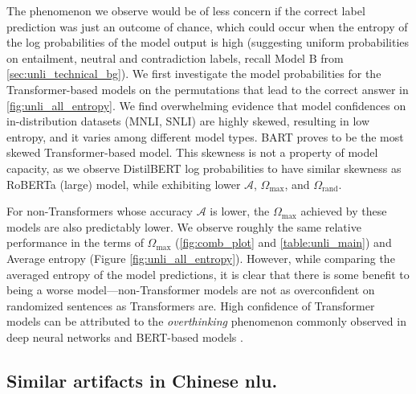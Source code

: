 \documentclass[letterpaper, 12pt]{report}
\begin{document}
The phenomenon we observe would be of less concern if the correct label prediction was just an outcome of chance, which could occur when the entropy of the log probabilities of the model output is high (suggesting uniform probabilities on entailment, neutral and contradiction labels, recall Model B from \autoref{sec:unli_technical_bg}). We first investigate the model probabilities for the Transformer-based models on the permutations that lead to the correct answer in \autoref{fig:unli_all_entropy}. We find overwhelming evidence that model confidences on in-distribution datasets (MNLI, SNLI) are highly skewed, resulting in low entropy, and it varies among different model types. BART proves to be the most skewed Transformer-based model. This skewness is not a property of model capacity, as we observe DistilBERT log probabilities to have similar skewness as RoBERTa (large) model, while exhibiting lower $\mathcal{A}$, $\Omega_{\text{max}}$, and $\Omega_{\text{rand}}$.



For non-Transformers whose accuracy $\mathcal{A}$ is lower, the $\Omega_{\text{max}}$ achieved by these models are also predictably lower. We observe roughly the same relative performance in the terms of $\Omega_{\text{max}}$ (\autoref{fig:comb_plot} and \autoref{table:unli_main}) and Average entropy (Figure \ref{fig:unli_all_entropy}). However, while comparing the averaged entropy of the model predictions, it is clear that there is some benefit to being a worse model---non-Transformer models are not as overconfident on randomized sentences as Transformers are.
High confidence of Transformer models can be attributed to the \textit{overthinking} phenomenon commonly observed in deep neural networks \cite{kaya2019shallowdeep} and BERT-based models \cite{zhou2020bert}.


\subsection{Similar artifacts in Chinese \acrshort{nlu}.}
\label{sec:unli_ocnli_results}
\end{document}

